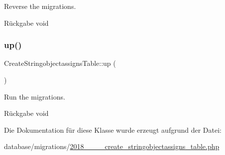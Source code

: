 Reverse the migrations.

\begin{DoxyReturn}{Rückgabe}
void 
\end{DoxyReturn}
\mbox{\label{classCreateStringobjectassignsTable_ab15ff0c19cc2f4d9dc8041b0136d4a3e}} 
\subsubsection{\texorpdfstring{up()}{up()}}
{\footnotesize\ttfamily Create\+Stringobjectassigns\+Table\+::up (\begin{DoxyParamCaption}{ }\end{DoxyParamCaption})}

Run the migrations.

\begin{DoxyReturn}{Rückgabe}
void 
\end{DoxyReturn}


Die Dokumentation für diese Klasse wurde erzeugt aufgrund der Datei\+:\begin{DoxyCompactItemize}
\item 
database/migrations/\hyperlink{2018__06__19__120455__create__stringobjectassigns__table_8php}{2018\+\_\+\_\+\_\+\_\+create\+\_\+stringobjectassigns\+\_\+table.\+php}\end{DoxyCompactItemize}

